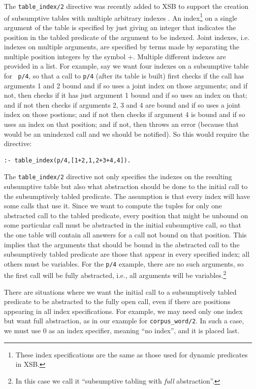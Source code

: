 The {\tt table\_index/2} directive was recently added to XSB to
support the creation of subsumptive tables with multiple arbitrary
indexes \cite{xsbmanual}.  An index\footnote{These index specifications are the
  same as those used for dynamic predicates in XSB.} on a
single argument of the table is specified by just giving an integer
that indicates the position in the tabled predicate of the argument to
be indexed.  Joint indexes, i.e. indexes on multiple arguments, are
specified by terms made by separating the multiple position integers
by the symbol $+$.  Multiple different indexes are provided in a list.
For example, say we want four indexes on a subsumptive table for {\tt
  p/4}, so that a call to {\tt p/4} (after its table is built) first
checks if the call has arguments 1 and 2 bound and if so uses a joint
index on those arguments; and if not, then checks if it has just
argument 1 bound and if so uses an index on that; and if not then
checks if arguments 2, 3 and 4 are bound and if so uses a joint index
on those postions; and if not then checks if argument 4 is bound and
if so uses an index on that position; and if not, then throws an error
(because that would be an unindexed call and we should be notified).
So this would require the directive:
\begin{verbatim}
:- table_index(p/4,[1+2,1,2+3+4,4]).
\end{verbatim}
The {\tt table\_index/2} directive not only specifies the indexes on
the resulting subsumptive table but also what abstraction should be
done to the initial call to the subsumptively tabled predicate.  The
assumption is that every index will have some calls that use it.
Since we want to compute the tuples for only one abstracted call to
the tabled predicate, every position that might be unbound on some
particular call must be abstracted in the initial subsumptive call, so
that the one table will contain all answers for a call not bound on
that position.  This implies that the arguments that should be bound
in the abstracted call to the subsumptively tabled predicate are those
that appear in every specified index; all others must be variables.
For the {\tt p/4} example, there are no such arguments, so the first
call will be fully abstracted, i.e., all arguments will be
variables.\footnote{In this case we call it ``subsumptive tabling with
  {\em full} abstraction''.}

There are situations where we want the initial call to a subsumptively
tabled predicate to be abstracted to the fully open call, even if
there are positions appearing in all index specifications.  For
example, we may need only one index but want full abstraction, as in
our example for {\tt corpus\_word/2}.  In such a case, we must use $0$
as an index specifier, meaning ``no index'', and it is placed last.

